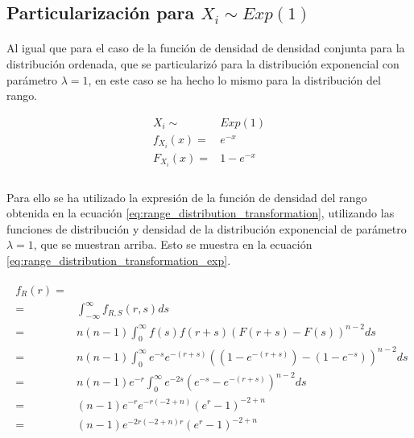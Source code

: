 \documentclass{article}
\begin{document}
    \subsection{Particularización para $X_i \sim Exp(1)$}

      \paragraph{}
      Al igual que para el caso de la función de densidad de densidad conjunta para la distribución ordenada, que se particularizó para la distribución exponencial con parámetro $\lambda = 1$, en este caso se ha hecho lo mismo para la distribución del rango.

      \begin{align*}
        X_i \sim& Exp(1)\\
        f_{X_{i}}(x) =& e^{-x}\\
        F_{X_{i}}(x) =& 1-e^{-x} \\
      \end{align*}

      \paragraph{}
      Para ello se ha utilizado la expresión de la función de densidad del rango obtenida en la ecuación \eqref{eq:range_distribution_transformation}, utilizando las funciones de distribución y densidad de la distribución exponencial de parámetro $\lambda = 1$, que se muestran arriba. Esto se muestra en la ecuación \eqref{eq:range_distribution_transformation_exp}.

      \begin{align}
      \label{eq:range_distribution_transformation_exp}
        \begin{split}
          f_{R} (r) =&\\
          =& \int_{-\infty}^{\infty} f_{R,S}(r,s) ds \\
          =& n(n-1)\int_{0}^{\infty} f(s)f(r+s)(F(r+s) - F(s))^{n-2} ds \\
          =& n(n-1)\int_{0}^{\infty} e^{-s}e^{-(r+s)}((1-e^{-(r+s)}) - (1-e^{-s}))^{n-2} ds \\
          =& n(n-1)e^{-r}\int_{0}^{\infty} e^{-2s}( e^{-s} - e^{-(r+s)})^{n-2} ds \\
          =& (n-1)e^{-r}e^{-r(-2 + n)} (e^r -1)^{-2 + n} \\
          =& (n-1)e^{-2r(-2 + n) r} (e^r -1)^{-2 + n}
        \end{split}
      \end{align}
\end{document}
